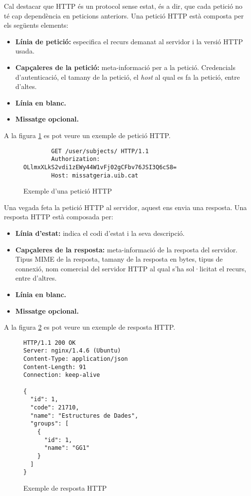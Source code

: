 Cal destacar que \ac{HTTP} és un protocol sense estat, és a dir, que cada petició no té cap dependència en peticions anteriors. Una petició \ac{HTTP} està composta per els següents elements:
\begin{itemize}
	\item \textbf{Línia de petició:} especifica el recurs demanat al servidor i la versió \ac{HTTP} usada.
	\item \textbf{Capçaleres de la petició:} meta-informació per a la petició. Credencials d'autenticació, el tamany de la petició, el \emph{host} al qual es fa la petició, entre d'altes.
	\item \textbf{Línia en blanc.}
	\item \textbf{Missatge opcional.}
\end{itemize}
 
A la figura \ref{fig:exemple_peticio_http} es pot veure un exemple de petició \ac{HTTP}.

\begin{figure}[h!]
	\begin{verbatim}
		GET /user/subjects/ HTTP/1.1
		Authorization: OLlmxXLkS2vdi1zEWy44W1vFj02gCFbv76JSI3Q6cS8=
		Host: missatgeria.uib.cat
	\end{verbatim}
\caption{Exemple d'una petició \ac{HTTP}}
\label{fig:exemple_peticio_http}
\end{figure}

Una vegada feta la petició \ac{HTTP} al servidor, aquest ens envia una resposta. Una resposta \ac{HTTP} està composada per:

\begin{itemize}
	\item \textbf{Línia d'estat:} indica el codi d'estat i la seva descripció.
	\item \textbf{Capçaleres de la resposta:} meta-informació de la resposta del servidor. Tipus \ac{MIME} de la resposta, tamany de la resposta en bytes, tipus de connexió, nom comercial del servidor \ac{HTTP} al qual s'ha sol·licitat el recurs, entre d'altres.
	\item \textbf{Línia en blanc.}
	\item \textbf{Missatge opcional.}
\end{itemize}

A la figura \ref{fig:exemple_resposta_http} es pot veure un exemple de resposta \ac{HTTP}.\\

\begin{figure}[h!]
	\begin{verbatim}
HTTP/1.1 200 OK
Server: nginx/1.4.6 (Ubuntu)
Content-Type: application/json
Content-Length: 91
Connection: keep-alive
		
{
  "id": 1,
  "code": 21710,
  "name": "Estructures de Dades",
  "groups": [
    {
      "id": 1,
      "name": "GG1"
    }
  ]
}
  	\end{verbatim}
  	\caption{Exemple de resposta \ac{HTTP}}
  	\label{fig:exemple_resposta_http}
 \end{figure}
 
